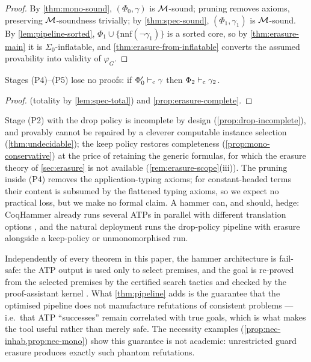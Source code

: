 \begin{proof}
By \cref{thm:mono-sound}, $(\Phi_0, \gamma)$ is $\mathcal{M}$-sound;
pruning removes axioms, preserving $\mathcal{M}$-soundness trivially; by
\cref{thm:spec-sound}, $(\Phi_1, \gamma_1)$ is $\mathcal{M}$-sound.  By
\cref{lem:pipeline-sorted}, $\Phi_1 \cup
\{\mathrm{nnf}(\neg\gamma_1)\}$ is a sorted core, so by
\cref{thm:erasure-main} it is $\Sigma_0$-inflatable, and
\cref{thm:erasure-from-inflatable} converts the assumed provability
into validity of $\varphi_G$.
\end{proof}

\begin{proposition}
\label{prop:pipeline-complete}
Stages (P4)--(P5) lose no proofs: if $\Phi_0' \vdash_{\mathrm{c}} \gamma$
then $\Phi_2 \vdash_{\mathrm{c}} \gamma_2$.
\end{proposition}

\begin{proof}
 (totality by \cref{lem:spec-total}) and
\cref{prop:erasure-complete}.
\end{proof}

\begin{remark}
Stage (P2) with the drop policy is incomplete by design
(\cref{prop:drop-incomplete}), and provably cannot be repaired by a
cleverer computable instance selection
(\cref{thm:undecidable}); the keep policy restores completeness
(\cref{prop:mono-conservative}) at the price of retaining the
generic formulas, for which the erasure theory of
\cref{sec:erasure} is not available
(\cref{rem:erasure-scope}(iii)).  The pruning inside (P4) removes
the application-typing axioms; for constant-headed terms their
content is subsumed by the flattened typing axioms, so we expect no
practical loss, but we make no formal claim.  A hammer can, and
should, hedge: CoqHammer already runs several ATPs in parallel with
different translation options \cite{CzajkaKaliszyk2018}, and the
natural deployment runs the drop-policy pipeline with erasure
alongside a keep-policy or unmonomorphised run.
\end{remark}

\begin{remark}
\label{rem:absolute-safety}
Independently of every theorem in this paper, the hammer
architecture is fail-safe: the ATP output is used only to select
premises, and the goal is re-proved from the selected premises by
the certified search tactics and checked by the proof-assistant
kernel \cite{CzajkaKaliszyk2018}.  What
\cref{thm:pipeline} adds is the guarantee that the optimised
pipeline does not manufacture refutations of consistent problems
--- i.e.\ that ATP ``successes'' remain correlated with true goals,
which is what makes the tool useful rather than merely safe.  The
necessity examples
(\cref{prop:nec-inhab,prop:nec-mono}) show this guarantee is not
academic: unrestricted guard erasure produces exactly such phantom
refutations.
\end{remark}

